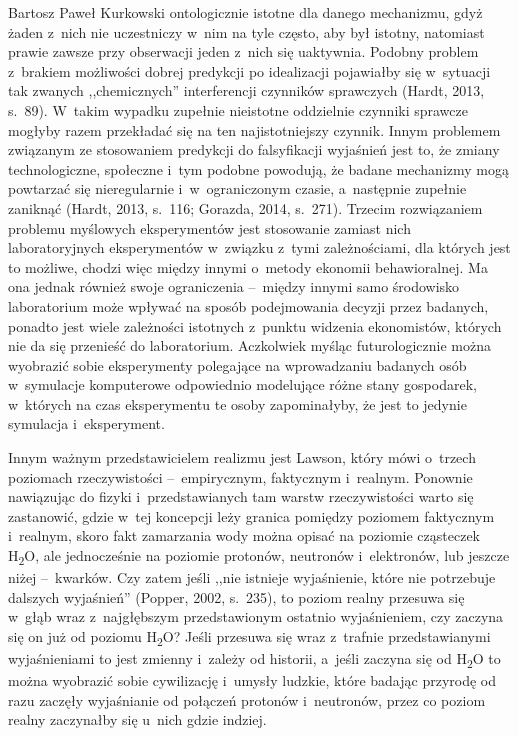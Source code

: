 \begin{artplenv}{Bartosz Paweł Kurkowski}
ontologicznie istotne dla danego mechanizmu, gdyż żaden z~nich nie uczestniczy w~nim na tyle często, aby był istotny,
natomiast prawie zawsze przy obserwacji jeden z~nich się uaktywnia. Podobny problem z~brakiem możliwości dobrej
predykcji po idealizacji pojawiałby się w~sytuacji tak zwanych ,,chemicznych'' interferencji czynników sprawczych
\label{ref:RNDWpUEzsysKD}(Hardt, 2013, s.~89). W~takim wypadku zupełnie nieistotne oddzielnie czynniki sprawcze mogłyby
razem przekładać się na ten najistotniejszy czynnik. Innym problemem związanym ze stosowaniem predykcji do falsyfikacji
wyjaśnień jest to, że zmiany technologiczne, społeczne i~tym podobne powodują, że badane mechanizmy mogą powtarzać się
nieregularnie i~w~ograniczonym czasie, a~następnie zupełnie zaniknąć \label{ref:RNDvHGcp92OgB}(Hardt, 2013, s.~116;
Gorazda, 2014, s.~271). Trzecim rozwiązaniem problemu myślowych eksperymentów jest stosowanie zamiast nich
laboratoryjnych eksperymentów w~związku z~tymi zależnościami, dla których jest to możliwe, chodzi więc między
innymi o~metody ekonomii behawioralnej. Ma ona jednak również swoje ograniczenia --~między innymi samo środowisko laboratorium
może wpływać na sposób podejmowania decyzji przez badanych, ponadto jest wiele zależności istotnych z~punktu widzenia
ekonomistów, których nie da się przenieść do laboratorium. Aczkolwiek myśląc futurologicznie można wyobrazić sobie
eksperymenty polegające na wprowadzaniu badanych osób w~symulacje komputerowe odpowiednio modelujące różne stany
gospodarek, w~których na czas eksperymentu te osoby zapominałyby, że jest to jedynie symulacja i~eksperyment.


Innym ważnym przedstawicielem realizmu jest Lawson, który mówi o~trzech poziomach rzeczywistości --~empirycznym,
faktycznym i~realnym. Ponownie nawiązując do fizyki i~przedstawianych tam warstw rzeczywistości warto się zastanowić,
gdzie w~tej koncepcji leży granica pomiędzy poziomem faktycznym i~realnym, skoro fakt zamarzania wody można opisać na
poziomie cząsteczek H\textsubscript{2}O, ale jednocześnie na poziomie protonów, neutronów i~elektronów, lub jeszcze
niżej --~kwarków. Czy zatem jeśli ,,nie istnieje wyjaśnienie, które nie potrzebuje dalszych wyjaśnień''
\label{ref:RNDlRbZlFRlJj}(Popper, 2002, s.~235), to poziom realny przesuwa się w~głąb wraz z~najgłębszym przedstawionym
ostatnio wyjaśnieniem, czy zaczyna się on już od poziomu H\textsubscript{2}O? Jeśli przesuwa się wraz z~trafnie
przedstawianymi wyjaśnieniami to jest zmienny i~zależy od historii, a~jeśli zaczyna się od H\textsubscript{2}O to można
wyobrazić sobie cywilizację i~umysły ludzkie, które badając przyrodę od razu zaczęły wyjaśnianie od połączeń
protonów i~neutronów, przez co poziom realny zaczynałby się u~nich gdzie indziej.



\end{artplenv}
